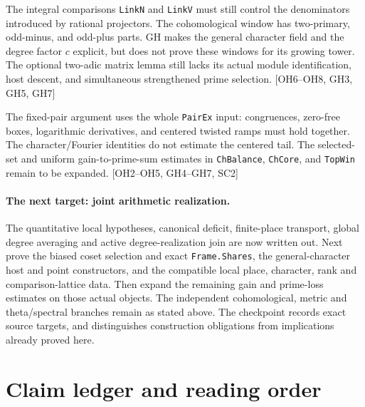 \documentclass[11pt,a4paper]{article}
\numberwithin{equation}{section}
\theoremstyle{remark}\newtheorem{remark}[theorem]{Remark}
\begin{document}
\begin{description}[style=nextline]
\item[Congruence denominators and cohomological windows.]
The integral comparisons \texttt{LinkN} and \texttt{LinkV} must still control the denominators introduced by rational projectors. The cohomological window has two-primary, odd-minus, and odd-plus parts. GH makes the general character field and the degree factor $c$ explicit, but does not prove these windows for its growing tower. The optional two-adic matrix lemma still lacks its actual module identification, host descent, and simultaneous strengthened prime selection. \textsf{[OH6--OH8, GH3, GH5, GH7]}

\item[Simultaneous prime selection and the centered target.]
The fixed-pair argument uses the whole \texttt{PairEx} input: congruences, zero-free boxes, logarithmic derivatives, and centered twisted ramps must hold together. The character/Fourier identities do not estimate the centered tail. The selected-set and uniform gain-to-prime-sum estimates in \texttt{ChBalance}, \texttt{ChCore}, and \texttt{TopWin} remain to be expanded. \textsf{[OH2--OH5, GH4--GH7, SC2]}
\end{description}

\paragraph{The next target: joint arithmetic realization.}
The quantitative local hypotheses, canonical deficit, finite-place
transport, global degree averaging and active degree-realization join
are now written out. Next prove the biased coset selection and exact
\texttt{Frame.Shares}, the general-character host and point constructors,
and the compatible local place, character, rank and comparison-lattice
data. Then expand the remaining gain and prime-loss estimates on those
actual objects. The independent cohomological, metric and theta/spectral
branches remain as stated above. The checkpoint records exact source
targets, and distinguishes construction obligations from implications
already proved here.

\section{Claim ledger and reading order}
\end{document}
